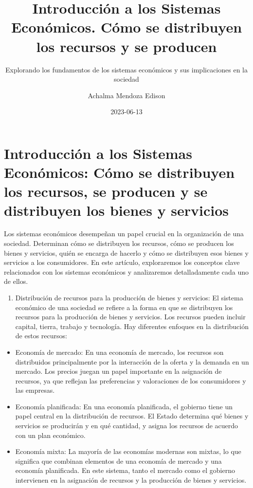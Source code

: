 \documentclass[
  letterpaper,
  DIV=11,
  numbers=noendperiod]{scrartcl}
\title{Introducción a los Sistemas Económicos. Cómo se distribuyen los
recursos y se producen}
\subtitle{Explorando los fundamentos de los sistemas económicos y sus
implicaciones en la sociedad}
\author{Achalma Mendoza Edison}
\date{2023-06-13}
\providecommand{\tightlist}{%
  \setlength{\itemsep}{0pt}\setlength{\parskip}{0pt}}\usepackage{longtable,booktabs,array}
\begin{document}
\maketitle
\ifdefined\Shaded\renewenvironment{Shaded}{\begin{tcolorbox}[sharp corners, boxrule=0pt, interior hidden, borderline west={3pt}{0pt}{shadecolor}, enhanced, breakable, frame hidden]}{\end{tcolorbox}}\fi

\hypertarget{introducciuxf3n-a-los-sistemas-econuxf3micos-cuxf3mo-se-distribuyen-los-recursos-se-producen-y-se-distribuyen-los-bienes-y-servicios}{%
\section{Introducción a los Sistemas Económicos: Cómo se distribuyen los
recursos, se producen y se distribuyen los bienes y
servicios}\label{introducciuxf3n-a-los-sistemas-econuxf3micos-cuxf3mo-se-distribuyen-los-recursos-se-producen-y-se-distribuyen-los-bienes-y-servicios}}

Los sistemas económicos desempeñan un papel crucial en la organización
de una sociedad. Determinan cómo se distribuyen los recursos, cómo se
producen los bienes y servicios, quién se encarga de hacerlo y cómo se
distribuyen esos bienes y servicios a los consumidores. En este
artículo, exploraremos los conceptos clave relacionados con los sistemas
económicos y analizaremos detalladamente cada uno de ellos.

\begin{enumerate}
\def\labelenumi{\arabic{enumi}.}
\tightlist
\item
  Distribución de recursos para la producción de bienes y servicios: El
  sistema económico de una sociedad se refiere a la forma en que se
  distribuyen los recursos para la producción de bienes y servicios. Los
  recursos pueden incluir capital, tierra, trabajo y tecnología. Hay
  diferentes enfoques en la distribución de estos recursos:
\end{enumerate}

\begin{itemize}
\item
  Economía de mercado: En una economía de mercado, los recursos son
  distribuidos principalmente por la interacción de la oferta y la
  demanda en un mercado. Los precios juegan un papel importante en la
  asignación de recursos, ya que reflejan las preferencias y
  valoraciones de los consumidores y las empresas.
\item
  Economía planificada: En una economía planificada, el gobierno tiene
  un papel central en la distribución de recursos. El Estado determina
  qué bienes y servicios se producirán y en qué cantidad, y asigna los
  recursos de acuerdo con un plan económico.
\item
  Economía mixta: La mayoría de las economías modernas son mixtas, lo
  que significa que combinan elementos de una economía de mercado y una
  economía planificada. En este sistema, tanto el mercado como el
  gobierno intervienen en la asignación de recursos y la producción de
  bienes y servicios.
\end{itemize}
\end{document}
